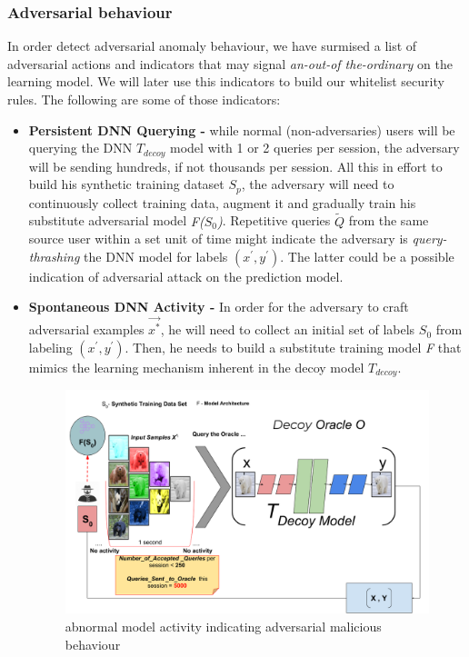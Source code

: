 \documentclass[grad,lot,lof,11pt,oneside,onehalfspace]{RUthesis}
\begin{document}
\subsubsection{Adversarial behaviour} In order detect adversarial anomaly  behaviour, we have surmised a list of adversarial actions and indicators that may signal \textit{an-out-of the-ordinary} on the learning model. We will later use this indicators to build our whitelist security rules. The following are some of those indicators:
\begin{itemize}
	\item \textbf{Persistent DNN Querying -}
	while normal (non-adversaries) users will be querying the DNN \textit{$T_{decoy}$} model with 1 or 2 queries per session, the adversary will be sending hundreds, if not thousands per session. All this in effort to build his synthetic training dataset \textit{$S_{p}$}, the adversary will need to continuously collect training data, augment it and gradually train his substitute adversarial model \textit{F($S_{0}$)}. Repetitive queries \textit{$\tilde{Q}$} from the same source user within a set unit of time might indicate the adversary is \textit{query-thrashing} the DNN model for labels $(x^{'},y^{'})$. The latter could be a possible indication of adversarial attack on the prediction model. 
	\item \textbf{Spontaneous DNN Activity -}  
	In order for the adversary to craft adversarial examples \textit{$\vec{x^{*}}$}, he will need to collect an initial set of labels \textit{$S_{0}$} from labeling $(x^{'},y^{'})$. Then, he needs to build a substitute training model \textit{F} that mimics the learning mechanism inherent in the decoy model \textit{$T_{decoy}$}. 
	\begin{figure}[h]
		\centering
		\includegraphics[width=0.7\linewidth]{"Images/Chapter 4/Queries"}
		\caption{abnormal model activity indicating adversarial malicious behaviour}
		\label{fig:Queries}
	\end{figure}

\end{itemize}
\end{document}

